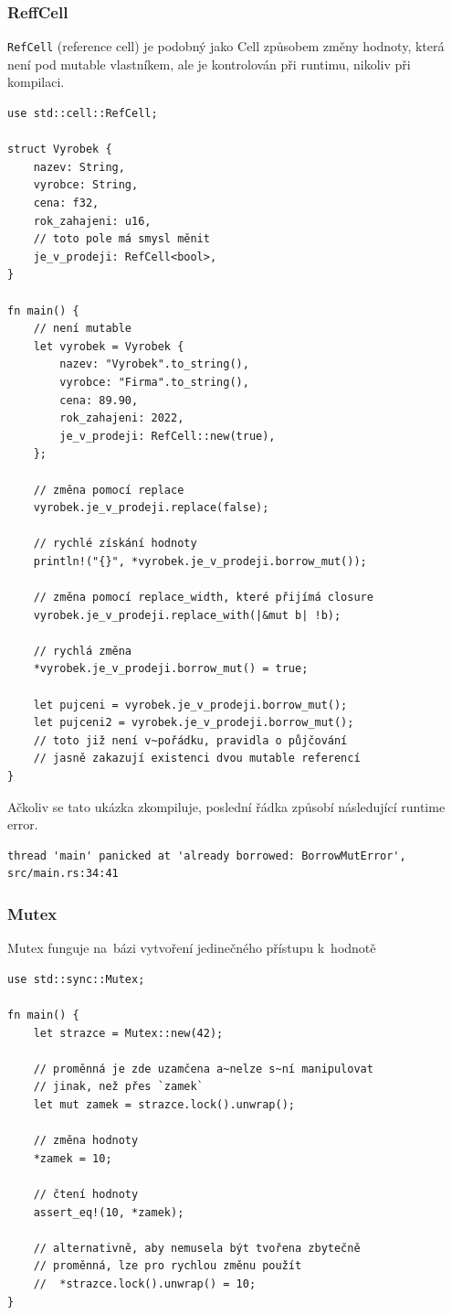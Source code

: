 \documentclass[a4paper, 12pt]{article} %
\newcommand{\rust}[1]{\texttt{#1}}
\begin{document}
        \subsubsection*{ReffCell}
            \rust{RefCell} (reference cell) je podobný jako Cell způsobem změny hodnoty, která není pod mutable vlastníkem, ale je kontrolován při runtimu, nikoliv při kompilaci. 
            \begin{verbatim}
use std::cell::RefCell;

struct Vyrobek {
    nazev: String,
    vyrobce: String,
    cena: f32,
    rok_zahajeni: u16,
    // toto pole má smysl měnit
    je_v_prodeji: RefCell<bool>,
}

fn main() {
    // není mutable
    let vyrobek = Vyrobek {
        nazev: "Vyrobek".to_string(),
        vyrobce: "Firma".to_string(),
        cena: 89.90,
        rok_zahajeni: 2022,
        je_v_prodeji: RefCell::new(true),
    };

    // změna pomocí replace
    vyrobek.je_v_prodeji.replace(false);

    // rychlé získání hodnoty
    println!("{}", *vyrobek.je_v_prodeji.borrow_mut());

    // změna pomocí replace_width, které přijímá closure
    vyrobek.je_v_prodeji.replace_with(|&mut b| !b);
    
    // rychlá změna
    *vyrobek.je_v_prodeji.borrow_mut() = true;
    
    let pujceni = vyrobek.je_v_prodeji.borrow_mut();
    let pujceni2 = vyrobek.je_v_prodeji.borrow_mut();
    // toto již není v~pořádku, pravidla o půjčování
    // jasně zakazují existenci dvou mutable referencí
}
            \end{verbatim}
            
            Ačkoliv se tato ukázka zkompiluje, poslední řádka způsobí následující runtime error.
            \begin{verbatim}
thread 'main' panicked at 'already borrowed: BorrowMutError', src/main.rs:34:41
            \end{verbatim}

        \subsubsection*{Mutex}
            Mutex funguje na~bázi vytvoření jedinečného přístupu k~hodnotě
            \begin{verbatim}
use std::sync::Mutex;

fn main() {
    let strazce = Mutex::new(42);
    
    // proměnná je zde uzamčena a~nelze s~ní manipulovat
    // jinak, než přes `zamek`
    let mut zamek = strazce.lock().unwrap();
    
    // změna hodnoty
    *zamek = 10;
    
    // čtení hodnoty
    assert_eq!(10, *zamek);
    
    // alternativně, aby nemusela být tvořena zbytečně
    // proměnná, lze pro rychlou změnu použít
    //  *strazce.lock().unwrap() = 10;
}
            \end{verbatim}
            
\end{document}
